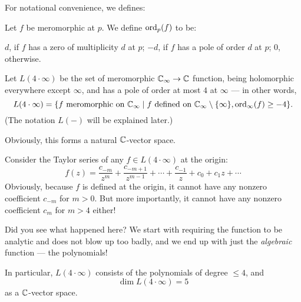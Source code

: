 For notational convenience, we defines:
\begin{definition}
	Let $f$ be meromorphic at $p$. We define $\operatorname{ord}_p(f)$ to be:
	\begin{itemize}
		\ii $d$, if $f$ has a zero of multiplicity $d$ at $p$;
		\ii $-d$, if $f$ has a pole of order $d$ at $p$;
		\ii $0$, otherwise.
	\end{itemize}
\end{definition}

\begin{example}
	Let $L(4 \cdot \infty)$ be the set of meromorphic $\mathbb C_\infty \to \mathbb C$ function, being
	holomorphic everywhere except $\infty$, and has a pole of order at most $4$ at $\infty$ ---
	in other words,
	\[
		L(4 \cdot \infty) = \{ \text{$f$ meromorphic on $\mathbb C_\infty$} \mid \text{$f$ defined on
		$\mathbb C_\infty \setminus \{ \infty \}$}, \operatorname{ord}_\infty(f) \geq -4 \}.
	\]
	(The notation $L(-)$ will be explained later.)

	Obviously, this forms a natural $\mathbb C$-vector space.

	Consider the Taylor series of any $f \in L(4 \cdot \infty)$ at the origin:
	\[
		f(z) = \frac{c_{-m}}{z^m} + \frac{c_{-m+1}}{z^{m-1}} + \cdots + \frac{c_{-1}}{z} + c_0 +
		c_1 z + \cdots
	\]
	Obviously, because $f$ is defined at the origin, it cannot have any nonzero coefficient $c_{-m}$
	for $m > 0$.
	But more importantly, it cannot have any nonzero coefficient $c_m$ for $m > 4$
	either!\footnotemark

	Did you see what happened here? We start with requiring the function to be analytic and does not
	blow up too badly, and we end up with just the \emph{algebraic} function --- the polynomials!

	In particular, $L(4 \cdot \infty)$ consists of the polynomials of degree $\leq 4$, and
	\[
		\dim L(4 \cdot \infty) = 5
	\]
	as a $\mathbb C$-vector space.
\end{example}

